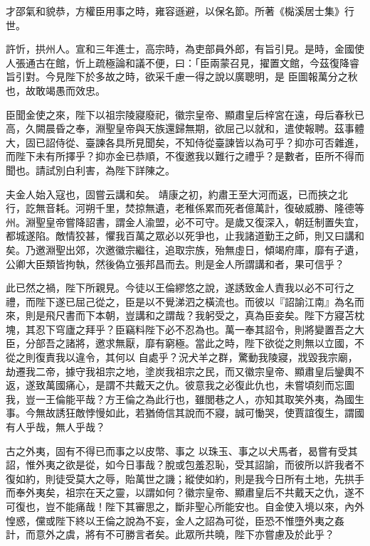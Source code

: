 \begin{pinyinscope}
 才邵氣和貌恭，方權臣用事之時，雍容遜避，以保名節。所著《檆溪居士集》行世。



 許忻，拱州人。宣和三年進士，高宗時，為吏部員外郎，有旨引見。是時，金國使人張通古在館，忻上疏極論和議不便，曰：「臣兩蒙召見，擢置文館，今茲復降睿旨引對。今見陛下於多故之時，欲采千慮一得之說以廣聰明，是
 臣圖報萬分之秋也，故敢竭愚而效忠。



 臣聞金使之來，陛下以祖宗陵寢廢祀，徽宗皇帝、顯肅皇后梓宮在遠，母后春秋已高，久闕晨昏之奉，淵聖皇帝與天族還歸無期，欲屈己以就和，遣使報聘。茲事體大，固已詔侍從、臺諫各具所見聞矣，不知侍從臺諫皆以為可乎？抑亦可否雜進，而陛下未有所擇乎？抑亦金已恭順，不復邀我以難行之禮乎？是數者，臣所不得而聞也。請試別白利害，為陛下詳陳之。



 夫金人始入寇也，固嘗云講和矣。
 靖康之初，約肅王至大河而返，已而挾之北行，訖無音耗。河朔千里，焚掠無遺，老稚係累而死者億萬計，復破威勝、隆德等州。淵聖皇帝嘗降詔書，謂金人渝盟，必不可守。是歲又復深入，朝廷制置失宜，都城遂陷。敵情狡甚，懼我百萬之眾必以死爭也，止我諸道勤王之師，則又曰講和矣。乃邀淵聖出郊，次邀徽宗繼往，追取宗族，殆無虛日，傾竭府庫，靡有孑遺，公卿大臣類皆拘執，然後偽立張邦昌而去。則是金人所謂講和者，果可信乎？



 此已然之禍，陛下所親見。今徒以王倫繆悠之說，遂誘致金人責我以必不可行之禮，而陛下遂已屈己從之，臣是以不覺涕泗之橫流也。而彼以『詔諭江南』為名而來，則是飛尺書而下本朝，豈講和之謂哉？我躬受之，真為臣妾矣。陛下方寢苫枕塊，其忍下穹廬之拜乎？臣竊料陛下必不忍為也。萬一奉其詔令，則將變置吾之大臣，分部吾之諸將，邀求無厭，靡有窮極。當此之時，陛下欲從之則無以立國，不從之則復責我以違令，其何以
 自處乎？況犬羊之群，驚動我陵寢，戕毀我宗廟，劫遷我二帝，據守我祖宗之地，塗炭我祖宗之民，而又徽宗皇帝、顯肅皇后鑾輿不返，遂致萬國痛心，是謂不共戴天之仇。彼意我之必復此仇也，未嘗頃刻而忘圖我，豈一王倫能平哉？方王倫之為此行也，雖閭巷之人，亦知其取笑外夷，為國生事。今無故誘狂敵悖慢如此，若猶倚信其說而不寢，誠可慟哭，使賈誼復生，謂國有人乎哉，無人乎哉？



 古之外夷，固有不得已而事之以皮幣、事之
 以珠玉、事之以犬馬者，曷嘗有受其詔，惟外夷之欲是從，如今日事哉？脫或包羞忍恥，受其詔諭，而彼所以許我者不復如約，則徒受莫大之辱，貽萬世之譏；縱使如約，則是我今日所有土地，先拱手而奉外夷矣，祖宗在天之靈，以謂如何？徽宗皇帝、顯肅皇后不共戴天之仇，遂不可復也，豈不能痛哉！陛下其審思之，斷非聖心所能安也。自金使入境以來，內外惶惑，儻或陛下終以王倫之說為不妄，金人之詔為可從，臣恐不惟墮外夷之姦
 計，而意外之虞，將有不可勝言者矣。此眾所共曉，陛下亦嘗慮及於此乎？




\end{pinyinscope}
